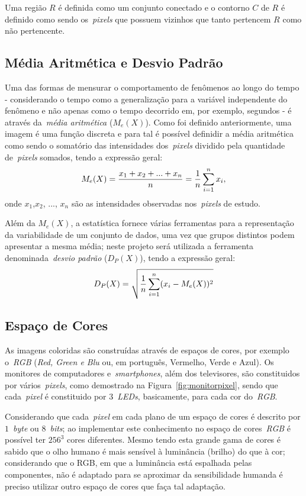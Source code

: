 \documentclass[conference]{Trabalho_1}
\begin{document}
Uma regi\~ao $R$ \'e definida como um conjunto conectado e o contorno $C$ de $R$ \'e definido como sendo os~\textit{pixels} que possuem vizinhos que tanto pertencem $R$ como n\~ao pertencente.


\subsection{M\'edia Aritm\'etica e Desvio Padr\~ao}
Uma das formas de mensurar o comportamento de fen\^omenos ao longo do tempo - considerando o tempo como a generaliza\c{c}\~ao para a vari\'avel independente do fen\^omeno e n\~ao apenas como o tempo decorrido em, por exemplo, segundos - \'e atrav\'es da~\textit{m\'edia aritm\'etica} ($M_e(X)$). Como foi definido anteriormente, uma imagem \'e uma fun\c{c}\~ao discreta e para tal \'e poss\'ivel definidir a m\'edia aritm\'etica como sendo o somat\'orio das intensidades dos~\textit{pixels} dividido pela quantidade de~\textit{pixels} somados, tendo a express\~ao geral:
$$M_e(X) = {{x_1 + x_2 + ... + x_n} \over {n}}  = {{{1} \over {n}} \sum\limits_{i = 1}^{n}x_i},$$
onde $x_1$,$x_2$, ..., $x_n$ s\~ao as intensidades observadas nos~\textit{pixels} de estudo.

Al\'em da $M_e(X)$, a estat\'istica fornece v\'arias ferramentas para a representa\c{c}\~ao da variabilidade de um conjunto de dados, uma vez que grupos distintos podem apresentar a mesma m\'edia; neste projeto ser\'a utilizada a ferramenta denominada~\textit{desvio padr\~ao} ($D_P(X)$), tendo a express\~ao geral:
$$D_P(X) = \sqrt{{{1} \over {n}} \sum\limits_{i = 1}^{n}(x_i - M_e(X))^2}$$

\subsection{Espa\c{c}o de Cores}
As imagens coloridas s\~ao constru\'idas atrav\'es de espa\c{c}os de cores, por exemplo o~\textit{RGB} (\textit{Red, Green e Blu} ou, em portugu\^es, Vermelho, Verde e Azul). Os monitores de computadores e~\textit{smartphones}, al\'em dos televisores, s\~ao constituidos por v\'arios~\textit{pixels}, como demostrado na Figura~\ref{fig:monitorpixel}, sendo que cada~\textit{pixel} \'e constituido por $3$~\textit{LEDs}, basicamente, para cada cor do~\textit{RGB}.

Considerando que cada~\textit{pixel} em cada plano de um espa\c{c}o de cores \'e descrito por $1$~\textit{byte} ou $8$~\textit{bits}; ao implementar este conhecimento no espa\c{c}o de cores~\textit{RGB} \'e poss\'ivel ter $256^3$ cores diferentes. Mesmo tendo esta grande gama de cores \'e sabido que o olho humano \'e mais sens\'ivel \`a lumin\^ancia (brilho) do que \`a cor; considerando que o RGB, em que a lumin\^ancia est\'a espalhada pelas componentes, n\~ao \'e adaptado para se aproximar da sensibilidade humanda \'e preciso utilizar outro espa\c{c}o de cores que fa\c{c}a tal adapta\c{c}\~ao.
\end{document}
